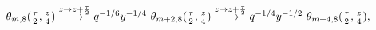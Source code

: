 \begin{equation}
  \begin{array}{l}
  \theta_{m,8}({\tau\over 2}, {z\over 4})
  \stackrel{z\to z+{\tau\over 2}}{\longrightarrow} q^{-1/6}
  y^{-1/4} ~\theta_{m+2,8}({\tau\over 2}, {z\over 4})
  \stackrel{z\to z+{\tau\over 2}}{\longrightarrow} q^{-1/4}
  y^{-1/2} ~\theta_{m+4,8}({\tau\over 2}, {z\over 4}),
  \end{array}
\end{equation}

